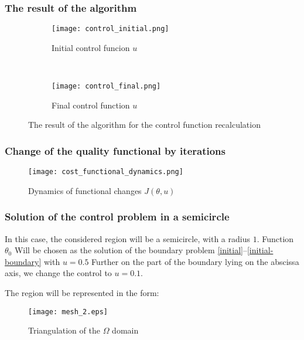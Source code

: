\documentclass[9pt]{beamer}
\begin{document}
\begin{frame}
    \frametitle{The result of the algorithm}

    \begin{figure}
        \begin{subfigure}[b]{0.5\textwidth}
        \texttt{[image: control\_initial.png]}
        \caption{Initial control funcion $u$}
        \end{subfigure}%
        ~ %
        \begin{subfigure}[b]{0.5\textwidth}
        \texttt{[image: control\_final.png]}
        \caption{Final control function $u$}
        \end{subfigure}
        \caption{The result of the algorithm for the control function recalculation}
    \end{figure}

\end{frame}

\begin{frame}
\frametitle{Change of the quality functional by iterations}

\begin{figure}[H]
    \centering
    \texttt{[image: cost\_functional\_dynamics.png]}
    \caption{Dynamics of functional changes $J(\theta,u)$}
\end{figure}
\end{frame}

\begin{frame}
    \frametitle{Solution of the control problem in a semicircle}


    In this case, the considered region will be a semicircle, with a radius $1$. Function $\theta_0$ Will be chosen as the solution of the boundary problem \eqref{initial}--\eqref{initial-boundary} with $u = 0.5$
    Further on the part of the boundary lying on the abscissa axis, we change the control to $u = 0.1$.

    The region will be represented in the form:
    \begin{figure}[H]
        \centering
        \texttt{[image: mesh\_2.eps]}
        \caption{Triangulation of the $\Omega$ domain}
    \end{figure}

\end{frame}
\end{document}
